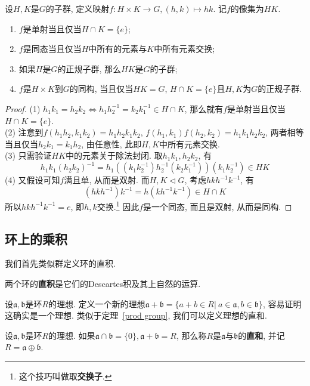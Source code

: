 \begin{thm}\label{prod group}
    设$H,K$是$G$的子群, 定义映射$f:H\times K\to G,(h,k)\mapsto hk$.
    记$f$的像集为$HK$.
    \begin{enumerate}[\rm (1)]
        \item $f$是单射当且仅当$H\cap K=\{e\}$;
        \item $f$是同态当且仅当$H$中所有的元素与$K$中所有元素交换;
        \item 如果$H$是$G$的正规子群, 那么$HK$是$G$的子群;
        \item $f$是$H\times K$到$G$的同构, 当且仅当$HK=G$, $H\cap K=\{e\}$且$H,K$为$G$的正规子群.
    \end{enumerate}
\end{thm}
\begin{proof}
    (1) $h_1k_1=h_2k_2\iff h_1h_2^{-1}=k_2k_1^{-1}\in H\cap K$, 那么就有$f$是单射当且仅当$H\cap K=\{e\}$.\\
    (2) 注意到$f(h_1h_2,k_1k_2)=h_1h_2k_1k_2$, $f(h_1,k_1)f(h_2,k_2)=h_1k_1h_2k_2$, 两者相等当且仅当$h_2k_1=k_1h_2$, 由任意性, 此即$H,K$中所有元素交换.\\
    (3) 只需验证$HK$中的元素关于除法封闭.
    取$h_1k_1,h_2k_2$, 有
    \[h_1k_1(h_2k_2)^{-1}=h_1((k_1k_2^{-1})h_2^{-1}(k_2k_1^{-1}))(k_1k_2^{-1})\in HK\]
    (4) 又假设可知$f$满且单, 从而是双射.
    而$H,K\lhd G$, 考虑$hkh^{-1}k^{-1}$, 有
    \[(hkh^{-1})k^{-1}=h(kh^{-1}k^{-1})\in H\cap K\]
    所以$hkh^{-1}k^{-1}=e$, 即$h,k$交换.\footnote{这个技巧叫做取\textbf{交换子}.}
    因此$f$是一个同态, 而且是双射, 从而是同构.
\end{proof}

\subsection{环上的乘积}

我们首先类似群定义环的直积.
\begin{defn}
    两个环的\textbf{直积}是它们的Descartes积及其上自然的运算.
\end{defn}

设$\mathfrak{a},\mathfrak{b}$是环$R$的理想.
定义一个新的理想$\mathfrak{a}+\mathfrak{b}=\{a+b\in R|\ a\in\mathfrak{a},b\in\mathfrak{b}\}$, 容易证明这确实是一个理想.
类似于定理~\ref{prod group}, 我们可以定义理想的直和.

\begin{defn}
    设$\mathfrak{a},\mathfrak{b}$是环$R$的理想.
    如果$\mathfrak{a}\cap\mathfrak{b}=\{0\},\mathfrak{a}+\mathfrak{b}=R$, 那么称$R$是$\mathfrak{a}$与$\mathfrak{b}$的\textbf{直和}, 并记$R=\mathfrak{a}\oplus\mathfrak{b}$.
\end{defn}

